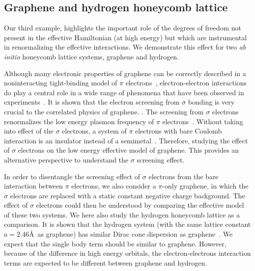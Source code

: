 \subsection{Graphene and hydrogen honeycomb lattice}
Our third example, highlights the important role of the degrees of freedom 
not present in the effective Hamiltonian (at high energy) but which are instrumental 
in renormalizing the effective interactions. 
We demonstrate this effect for two \textit{ab initio} honeycomb lattice systems, 
graphene and hydrogen. 

Although many electronic properties of graphene can be correctly described in a noninteracting tight-binding model of $\pi$ electrons~\cite{Castro2009}, electron-electron interactions do play a central role in a wide range of phenomena that have been observed in experiments~\cite{Kotov2012}. It is shown that the electron screening from $\sigma$ bonding is very crucial to the correlated physics of graphene. \cite{Zheng2016}. The screening from $\sigma$ electrons renormalizes the low energy plasmon frequency of $\pi$ electrons~\cite{Zheng2016}. Without taking into effect of the $\sigma$ electrons, a system of $\pi$ electrons with bare Coulomb interaction is an insulator instead of a semimetal~\cite{DrutPRL2009, DrutPRB2009,  Smith2014, Zheng2016}. Therefore, studying the effect of $\sigma$ electrons on the low energy effective model of graphene. This provides an alternative perspective to understand the $\sigma$ screening effect. 

In order to disentangle the screening effect of $\sigma$ electrons from the bare interaction between $\pi$ electrons, we also consider a $\pi$-only graphene, in which the $\sigma$ electrons are replaced with a static constant negative charge background. The effect of $\sigma$ electrons could then be understood by comparing the effective model of these two systems. 
We here also study the hydrogen honeycomb lattice as a comparison. It is shown that the hydrogen system (with the same lattice constant $a=2.46$\AA~as graphene) has similar Dirac cone dispersion as graphene~\cite{Zheng2016}. We expect that the single body term should be similar to graphene. However, because of the difference in high energy orbitals, the electron-electrons interaction terms are expected to be different between graphene and hydrogen. 

